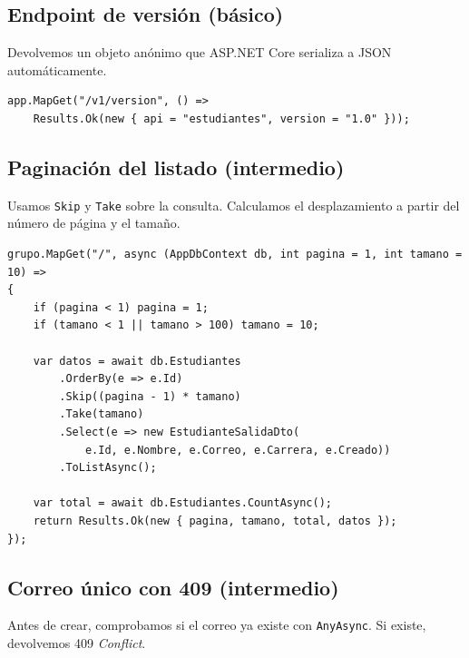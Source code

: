 \documentclass[11pt]{article}
\begin{document}
\subsection{Endpoint de versión (básico)}
Devolvemos un objeto anónimo que ASP.NET Core serializa a JSON automáticamente.

\begin{cajacodigo}
\begin{lstlisting}[style=cs]
app.MapGet("/v1/version", () =>
    Results.Ok(new { api = "estudiantes", version = "1.0" }));
\end{lstlisting}
\end{cajacodigo}

\subsection{Paginación del listado (intermedio)}
Usamos \texttt{Skip} y \texttt{Take} sobre la consulta. Calculamos el desplazamiento a partir del número de página y el tamaño.

\begin{cajacodigo}
\begin{lstlisting}[style=cs]
grupo.MapGet("/", async (AppDbContext db, int pagina = 1, int tamano = 10) =>
{
    if (pagina < 1) pagina = 1;
    if (tamano < 1 || tamano > 100) tamano = 10;

    var datos = await db.Estudiantes
        .OrderBy(e => e.Id)
        .Skip((pagina - 1) * tamano)
        .Take(tamano)
        .Select(e => new EstudianteSalidaDto(
            e.Id, e.Nombre, e.Correo, e.Carrera, e.Creado))
        .ToListAsync();

    var total = await db.Estudiantes.CountAsync();
    return Results.Ok(new { pagina, tamano, total, datos });
});
\end{lstlisting}
\end{cajacodigo}

\subsection{Correo único con 409 (intermedio)}
Antes de crear, comprobamos si el correo ya existe con \texttt{AnyAsync}. Si existe, devolvemos 409 \emph{Conflict}.
\end{document}
